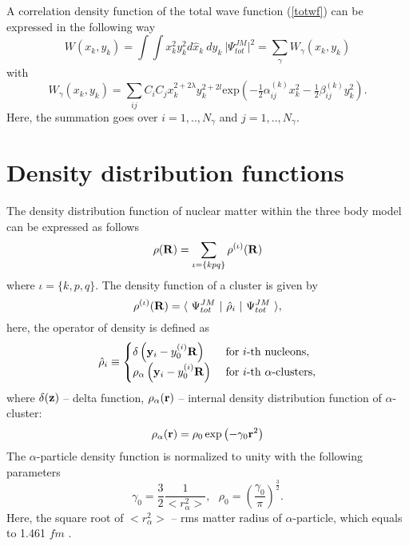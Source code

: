 \documentclass[
12pt, %
oneside, %
english, %
onehalfspacing, %
onehalfspacing, %
headsepline, %
]{MastersDoctoralThesis} %
\begin{document}
A correlation density function of the total wave function (\ref{totwf})  can be expressed in the following way
\begin{equation}
W\left( x_k,y_k \right) =
\int \int x_k^2 y_k^2 d\hat{x}_k~ d\hat{y}_k~ \vert \Psi^{JM}_{tot} \vert^2
=
 \sum_{\gamma}  W_{\gamma}\left( x_k,y_k \right)
\end{equation}
with 
\begin{equation}
W_{\gamma}\left( x_k,y_k \right) = \sum_{ij} C_i C_j x^{2+2\lambda}_k y^{2+2l}_k \text{exp}\left( - \tfrac{1}{2} \alpha^{(k)}_{ij} x_k^2 -  \tfrac{1}{2} \beta^{(k)}_{ij} y_k^2 \right) .
\end{equation}
Here, the summation goes over $i=1,..,N_\gamma$ and $j=1,..,N_\gamma$.


\section{Density distribution functions}
\label{section_density_function}

The density distribution function of nuclear matter within the three body model can be expressed as follows
\begin{equation}
\rho({\bf R}) = \sum_{\iota=\{kpq\}} \rho^{(\iota)} ({\bf R})
\end{equation}
where $\iota=\{k,p,q\}$.
The density function of a cluster is given by
\begin{equation}
\rho^{(\iota)}({\bf R})=
\langle~ \Psi_{tot}^{JM} ~\vert~ \hat{\rho}_i~ \vert~ \Psi_{tot}^{JM} ~\rangle,
\end{equation}
here, the operator of density is defined as
\begin{equation}
\hat{\rho}_i\equiv
\begin{cases}
\delta \left( {\bf y}_i - y_0^{(i)} {\bf R} \right) 
& ~{\rm for}~ i{\rm \text -th~nucleons} , \\
\rho_{\alpha} \left( {\bf y}_i - y_0^{(i)} {\bf R} \right)  & 
~{\rm for}~ i{\rm \text -th~\alpha\text -clusters},
\end{cases}
\end{equation}
where $\delta({\bf z})$ -- delta function, $\rho_\alpha({\bf r})$ -- internal density distribution function of $\alpha$-cluster:
\begin{equation}
\rho_{\alpha}({\bf r}) = \rho_0 \exp \left( - \gamma_0 {\bf r}^2 \right)
\end{equation}
The $\alpha$-particle density function is normalized to unity with the following parameters
\begin{equation}
\gamma_0=\frac{3}{2} \frac{1}{<r_\alpha^2>},~~~\rho_0=\left( \frac{\gamma_0}{\pi} \right)^{\tfrac{3}{2}}.
\label{rho_alpha_parameters}
\end{equation}
Here,  the square root of $<r_\alpha^2>$ -- rms matter radius of $\alpha$-particle, which equals to 1.461 $fm$ \cite{satchler1979folding}.
\end{document}
